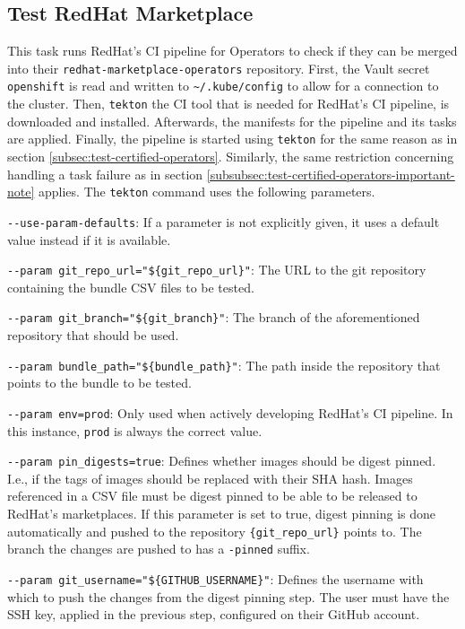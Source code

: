 \subsection{Test RedHat Marketplace}\label{subsec:test-redhat-marketplace}

This task runs RedHat's CI pipeline for Operators to check if they can be merged into their \verb|redhat-marketplace-operators| repository.
First, the Vault secret \verb|openshift| is read and written to \verb|~/.kube/config| to allow for a connection to the cluster.
Then, \verb|tekton| the CI tool that is needed for RedHat's CI pipeline, is downloaded and installed.
Afterwards, the manifests for the pipeline and its tasks are applied.
Finally, the pipeline is started using \verb|tekton| for the same reason as in section \ref{subsec:test-certified-operators}.
Similarly, the same restriction concerning handling a task failure as in section \ref{subsubsec:test-certified-operators-important-note} applies.
The \verb|tekton| command uses the following parameters.

\verb|--use-param-defaults|: If a parameter is not explicitly given, it uses a default value instead if it is available.

\verb|--param git_repo_url="${git_repo_url}"|: The URL to the git repository containing the bundle CSV files to be tested.

\verb|--param git_branch="${git_branch}"|: The branch of the aforementioned repository that should be used.

\verb|--param bundle_path="${bundle_path}"|: The path inside the repository that points to the bundle to be tested.

\verb|--param env=prod|: Only used when actively developing RedHat's CI pipeline.
In this instance, \verb|prod| is always the correct value.

\verb|--param pin_digests=true|: Defines whether images should be digest pinned.
I.e., if the tags of images should be replaced with their SHA hash.
Images referenced in a CSV file must be digest pinned to be able to be released to RedHat's marketplaces.
If this parameter is set to true, digest pinning is done automatically and pushed to the repository \verb|{git_repo_url}| points to.
The branch the changes are pushed to has a \verb|-pinned| suffix.

\verb|--param git_username="${GITHUB_USERNAME}"|: Defines the username with which to push the changes from the digest pinning step.
The user must have the SSH key, applied in the previous step, configured on their GitHub account.


